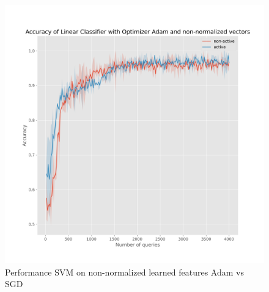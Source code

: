 \documentclass{article}
\begin{document}
\begin{figure}[t]
\begin{minipage}{.45\textwidth}
    \includegraphics[width=\linewidth]{active-vs-base-moons-linear-loss-Adam-non-normalized-ci}
  \end{minipage}
  \caption{Performance SVM on non-normalized learned features Adam vs SGD}\label{fig:svm-non-normalized-ci}
\end{figure}
\end{document}
